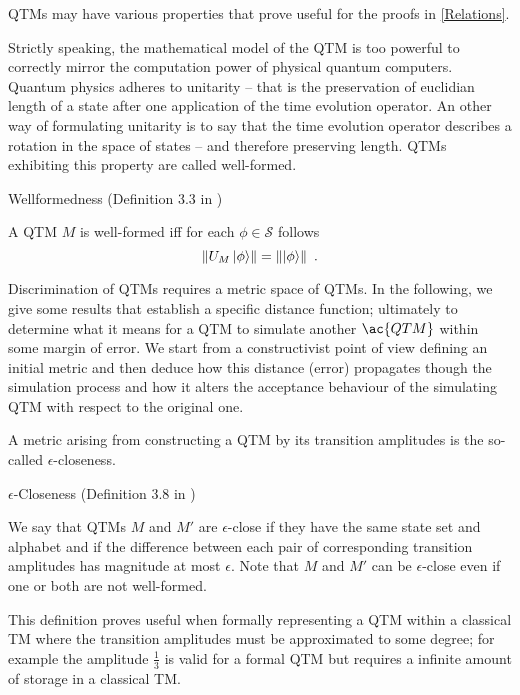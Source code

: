 \acp{QTM} may have various properties that prove useful for the proofs in \cref{Relations}.

Strictly speaking, the mathematical model of the \ac{QTM} is too powerful to correctly mirror the computation power of physical quantum computers.
Quantum physics adheres to unitarity -- that is the preservation of euclidian length of a state after one application of the time evolution operator.
An other way of formulating unitarity is to say that the time evolution operator describes a rotation in the space of states -- and therefore preserving length.
\acp{QTM} exhibiting this property are called well-formed.
\begin{definition}
Wellformedness (Definition 3.3 in \cite{bernstein_vazirani_1997})

A \ac{QTM} $M$ is well-formed iff for each $\phi\in\mathcal{S}$ follows
\begin{equation*}
    \left\lVert U_M\ket{\phi}\right\rVert=\left\lVert\ket{\phi}\right\rVert
    \ .
\end{equation*}
\end{definition}

Discrimination of \acp{QTM} requires a metric space of \acp{QTM}.
In the following, we give some results that establish a specific distance function; ultimately to determine what it means for a \ac{QTM} to simulate another $\ac{QTM}$ within some margin of error.
We start from a constructivist point of view defining an initial metric and then deduce how this distance (error) propagates though the simulation process and how it alters the acceptance behaviour of the simulating \ac{QTM} with respect to the original one.

A metric arising from constructing a \ac{QTM} by its transition amplitudes is the so-called $\epsilon$-closeness.
\begin{definition}
$\epsilon$-Closeness (Definition 3.8 in \cite{bernstein_vazirani_1997})

We say that \acp{QTM} $M$ and $M'$ are $\epsilon$-close if they have the same state set and alphabet and if the difference between each pair of corresponding transition amplitudes has magnitude at most $\epsilon$.
Note that $M$ and $M'$ can be $\epsilon$-close even if one or both are not well-formed.
\end{definition}
This definition proves useful when formally representing a \ac{QTM} within a classical \ac{TM} where the transition amplitudes must be approximated to some degree; for example the amplitude $\frac{1}{3}$ is valid for a formal \ac{QTM} but requires a infinite amount of storage in a classical \ac{TM}.

